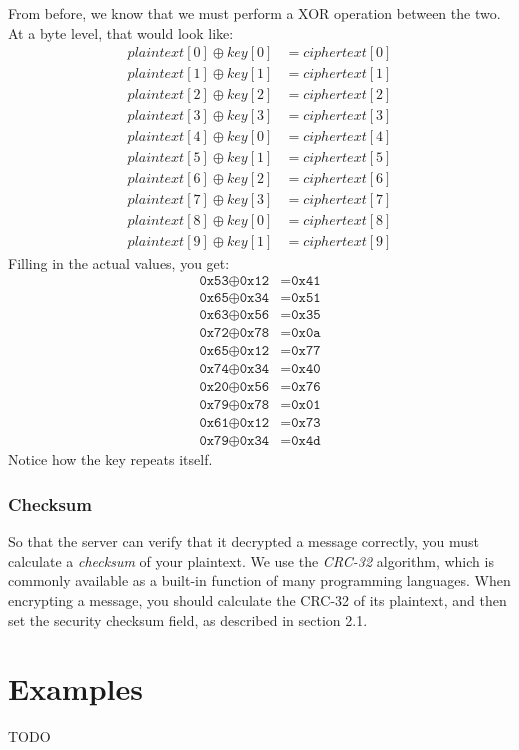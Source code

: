 \documentclass{report}
\newcommand{\code}[1]{\texttt{#1}}
\newcommand*\xor{\oplus}
\begin{document}
From before, we know that we must perform a XOR operation between the two. At a byte level, that would look like:
\begin{equation*}
\begin{split}
	plaintext[0] \xor key[0] &= ciphertext[0] \\
	plaintext[1] \xor key[1] &= ciphertext[1] \\
	plaintext[2] \xor key[2] &= ciphertext[2] \\
	plaintext[3] \xor key[3] &= ciphertext[3] \\
	plaintext[4] \xor key[0] &= ciphertext[4] \\
	plaintext[5] \xor key[1] &= ciphertext[5] \\
	plaintext[6] \xor key[2] &= ciphertext[6] \\
	plaintext[7] \xor key[3] &= ciphertext[7] \\
	plaintext[8] \xor key[0] &= ciphertext[8] \\
	plaintext[9] \xor key[1] &= ciphertext[9]
\end{split}
\end{equation*}
Filling in the actual values, you get:
\begin{equation*}
\begin{split}
	\code{0x53} \xor \code{0x12} &= \code{0x41} \\
	\code{0x65} \xor \code{0x34} &= \code{0x51} \\
	\code{0x63} \xor \code{0x56} &= \code{0x35} \\
	\code{0x72} \xor \code{0x78} &= \code{0x0a} \\
	\code{0x65} \xor \code{0x12} &= \code{0x77} \\
	\code{0x74} \xor \code{0x34} &= \code{0x40} \\
	\code{0x20} \xor \code{0x56} &= \code{0x76} \\
	\code{0x79} \xor \code{0x78} &= \code{0x01} \\
	\code{0x61} \xor \code{0x12} &= \code{0x73} \\
	\code{0x79} \xor \code{0x34} &= \code{0x4d}
\end{split}
\end{equation*}
Notice how the key repeats itself.

\subsection{Checksum}
So that the server can verify that it decrypted a message correctly, you must calculate a \emph{checksum} of your plaintext.
We use the \emph{CRC-32} algorithm, which is commonly available as a built-in function of many programming languages.
When encrypting a message, you should calculate the CRC-32 of its plaintext, and then set the security checksum field, as described in section 2.1.

\chapter{Examples}
TODO
\end{document}
